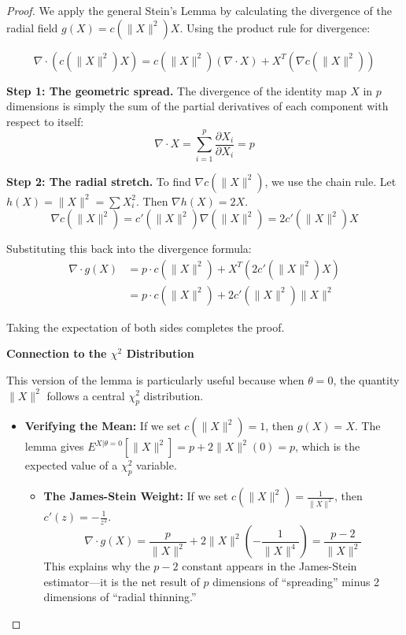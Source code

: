 \documentclass[
  letterpaper,
  DIV=11,
  numbers=noendperiod]{scrreprt}
\providecommand{\tightlist}{%
  \setlength{\itemsep}{0pt}\setlength{\parskip}{0pt}}
\renewcommand{\[}{\begin{equation}}
\renewcommand{\]}{\end{equation}}
\theoremstyle{definition}
\theoremstyle{plain}
\theoremstyle{plain}
\theoremstyle{plain}
\theoremstyle{definition}
\theoremstyle{plain}
\theoremstyle{remark}
\begin{document}
\begin{proof}
\leavevmode

We apply the general Stein's Lemma by calculating the divergence of the
radial field \(g(X) = c(\lVert X \rVert^2)X\). Using the product rule
for divergence:

\[
\nabla \cdot (c(\lVert X \rVert^2)X) = c(\lVert X \rVert^2) (\nabla \cdot X) + X^T (\nabla c(\lVert X \rVert^2))
\]

\textbf{Step 1: The geometric spread.} The divergence of the identity
map \(X\) in \(p\) dimensions is simply the sum of the partial
derivatives of each component with respect to itself: \[
\nabla \cdot X = \sum_{i=1}^p \frac{\partial X_i}{\partial X_i} = p
\]

\textbf{Step 2: The radial stretch.} To find
\(\nabla c(\lVert X \rVert^2)\), we use the chain rule. Let
\(h(X) = \lVert X \rVert^2 = \sum X_i^2\). Then \(\nabla h(X) = 2X\). \[
\nabla c(\lVert X \rVert^2) = c'(\lVert X \rVert^2) \nabla (\lVert X \rVert^2) = 2 c'(\lVert X \rVert^2) X
\]

Substituting this back into the divergence formula: \[
\begin{aligned}
\nabla \cdot g(X) &= p \cdot c(\lVert X \rVert^2) + X^T (2 c'(\lVert X \rVert^2) X) \\
&= p \cdot c(\lVert X \rVert^2) + 2 c'(\lVert X \rVert^2) \lVert X \rVert^2
\end{aligned}
\]

Taking the expectation of both sides completes the proof.

\textbf{Connection to the \(\chi^2\) Distribution}

This version of the lemma is particularly useful because when
\(\theta = 0\), the quantity \(\lVert X \rVert^2\) follows a central
\(\chi^2_p\) distribution.

\begin{itemize}
\tightlist
\item
  \textbf{Verifying the Mean:} If we set \(c(\lVert X \rVert^2) = 1\),
  then \(g(X) = X\). The lemma gives
  \(E^{X|\theta=0}[\lVert X \rVert^2] = p + 2\lVert X \rVert^2(0) = p\),
  which is the expected value of a \(\chi^2_p\) variable.

  \begin{itemize}
  \tightlist
  \item
    \textbf{The James-Stein Weight:} If we set
    \(c(\lVert X \rVert^2) = \frac{1}{\lVert X \rVert^2}\), then
    \(c'(z) = -\frac{1}{z^2}\). \[
    \nabla \cdot g(X) = \frac{p}{\lVert X \rVert^2} + 2 \lVert X \rVert^2 \left( -\frac{1}{\lVert X \rVert^4} \right) = \frac{p-2}{\lVert X \rVert^2}
    \] This explains why the \(p-2\) constant appears in the James-Stein
    estimator---it is the net result of \(p\) dimensions of
    ``spreading'' minus 2 dimensions of ``radial thinning.''
  \end{itemize}
\end{itemize}

\end{proof}
\end{document}
